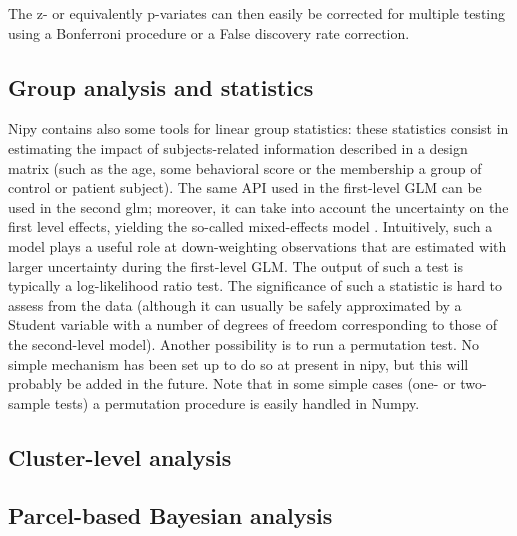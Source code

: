 \documentclass{bioinfo}
\begin{document}

\begin{widetext}

\end{widetext}

The z- or equivalently p-variates can then easily be corrected for
multiple testing using a Bonferroni procedure or a False discovery
rate correction.

\subsection{Group analysis and statistics}
Nipy contains also some tools for linear group statistics: these
statistics consist in estimating the impact of subjects-related
information described in a design matrix (such as the age, some
behavioral score or the membership a group of control or patient
subject).
%
The same API used in the first-level GLM can be used in the second
glm; moreover, it can take into account the uncertainty on the first
level effects, yielding the so-called mixed-effects model \cite{Roche2007}.
%
Intuitively, such a model plays a useful role at down-weighting
observations that are estimated with larger uncertainty during the
first-level GLM.
%
The output of such a test is typically a log-likelihood ratio test.
The significance of such a statistic is hard to assess from the data
(although it can usually be safely approximated by a Student variable
with a number of degrees of freedom corresponding to those of the
second-level model).
%
Another possibility is to run a permutation test. No simple mechanism
has been set up to do so at present in nipy, but this will probably be
added in the future.
%
Note that in some simple cases (one- or two-sample tests) a
permutation procedure is easily handled in Numpy.
%

\subsection{Cluster-level analysis}


\subsection{Parcel-based Bayesian analysis}
\end{document}
